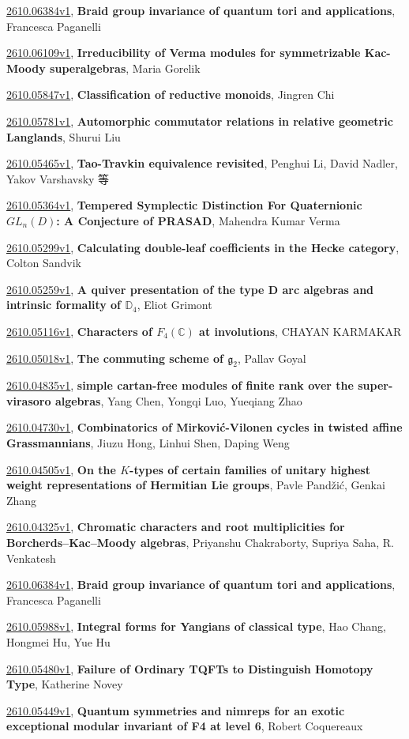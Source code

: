 \documentclass[9pt, a4paper]{article}
\theoremstyle{plain}
\theoremstyle{definition}
\theoremstyle{remark}
\newcommand{\arxiv}[3]{\href{https://arxiv.org/abs/#1}{#1}, \textbf{\textcolor{arxivblue}{#2}}, #3}
\begin{document}
\arxiv{2610.06384v1}{Braid group invariance of quantum tori and applications}{Francesca Paganelli}

\arxiv{2610.06109v1}{Irreducibility of Verma modules for symmetrizable Kac-Moody superalgebras}{Maria Gorelik}

\arxiv{2610.05847v1}{Classification of reductive monoids}{Jingren Chi}

\arxiv{2610.05781v1}{Automorphic commutator relations in relative geometric Langlands}{Shurui Liu}

\arxiv{2610.05465v1}{Tao-Travkin equivalence revisited}{Penghui Li, David Nadler, Yakov Varshavsky 等}

\arxiv{2610.05364v1}{Tempered Symplectic Distinction For Quaternionic $GL_n(D)$: A Conjecture of PRASAD}{Mahendra Kumar Verma}

\arxiv{2610.05299v1}{Calculating double-leaf coefficients in the Hecke category}{Colton Sandvik}

\arxiv{2610.05259v1}{A quiver presentation of the type D arc algebras and intrinsic formality of $\mathbb{D}_4$}{Eliot Grimont}

\arxiv{2610.05116v1}{Characters of $F_4(\mathbb{C})$ at involutions}{CHAYAN KARMAKAR}

\arxiv{2610.05018v1}{The commuting scheme of $\mathfrak{g}_2$}{Pallav Goyal}

\arxiv{2610.04835v1}{simple cartan-free modules of finite rank over the super-virasoro algebras}{Yang Chen, Yongqi Luo, Yueqiang Zhao}

\arxiv{2610.04730v1}{Combinatorics of Mirković-Vilonen cycles in twisted affine Grassmannians}{Jiuzu Hong, Linhui Shen, Daping Weng}

\arxiv{2610.04505v1}{On the $K$-types of certain families of unitary highest weight representations of Hermitian Lie groups}{Pavle Pand\v zić, Genkai Zhang}

\arxiv{2610.04325v1}{Chromatic characters and root multiplicities for Borcherds--Kac--Moody algebras}{Priyanshu Chakraborty, Supriya Saha, R. Venkatesh}

\arxiv{2610.06384v1}{Braid group invariance of quantum tori and applications}{Francesca Paganelli}

\arxiv{2610.05988v1}{Integral forms for Yangians of classical type}{Hao Chang, Hongmei Hu, Yue Hu}

\arxiv{2610.05480v1}{Failure of Ordinary TQFTs to Distinguish Homotopy Type}{Katherine Novey}

\arxiv{2610.05449v1}{Quantum symmetries and nimreps for an exotic exceptional modular invariant of F4 at level 6}{Robert Coquereaux}
\end{document}
